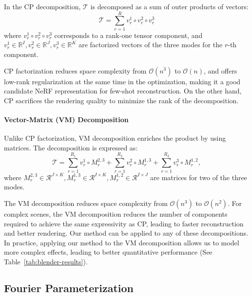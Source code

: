 In the CP decomposition, $\mathcal{T}$ is decomposed as a sum of outer products of vectors:
$$
\mathcal{T} = \sum_{r=1}^R v_r^1 \circ v_r^2 \circ v_r^3
$$
where $v_r^1 \circ v_r^2 \circ v_r^3$ corresponds to a rank-one tensor component, and $v_r^1 \in \mathbb{R}^I,v_r^2 \in \mathbb{R}^J,v_r^3 \in \mathbb{R}^K$ are factorized vectors of the three modes for the $r$-th component. 

CP factorization reduces space complexity from $\mathcal{O}(n^3)$ to $\mathcal{O}(n)$, and offers low-rank regularization at the same time in the optimization, making it a good candidate NeRF representation for few-shot reconstruction. On the other hand, CP sacrifices the rendering quality to minimize the rank of the decomposition.

\vspace{-1em}\paragraph{Vector-Matrix (VM) Decomposition}

Unlike CP factorization, VM decomposition enriches the product by using matrices. The decomposition is expressed as:
$$
\mathcal{T} = \sum_{r=1}^{R_1} v_r^1 \circ M_r^{2,3} + \sum_{r=1}^{R_2} v_r^2 \circ M_r^{1,3} + \sum_{r=1}^{R_3} v_r^3 \circ M_r^{1,2},
$$
where $M_r^{2,3} \in \mathcal{R}^{J\times K}, M_r^{1,3} \in \mathcal{R}^{I\times K}, M_r^{1,2} \in \mathcal{R}^{I\times J}$ are matrices for two of the three modes.

The VM decomposition reduces space complexity from $\mathcal{O}(n^3)$ to $\mathcal{O}(n^2)$. %
 For complex scenes, the VM decomposition reduces the number of components required to achieve the same expressivity as CP, leading to faster reconstruction and better rendering. Our method can be applied to any of these decompositions. In practice, applying our method to the VM decomposition allows us to model more complex effects, leading to better quantitative performance (See Table~\ref{tab:blender-results}).

\subsection{Fourier Parameterization}
\label{sec:fourier-parameterization}


